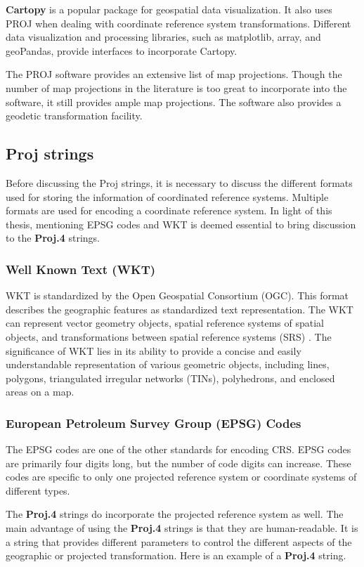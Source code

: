 \textbf{Cartopy} is a popular package for geospatial data visualization. It also uses PROJ when dealing with coordinate reference system transformations. Different data visualization and processing libraries, such as matplotlib, array, and geoPandas, provide interfaces to incorporate Cartopy.

The PROJ software provides an extensive list of map projections. Though the number of map projections in the literature is too great to incorporate into the software, it still provides ample map projections. The software also provides a geodetic transformation facility.

\subsection{Proj strings}
Before discussing the Proj strings, it is necessary to discuss the different formats used for storing the information of coordinated reference systems. Multiple formats are used for encoding a coordinate reference system. In light of this thesis, mentioning EPSG codes and WKT is deemed essential to bring discussion to the \textbf{Proj.4} strings.

\subsubsection{Well Known Text (WKT)}
WKT is standardized by the Open Geospatial Consortium (OGC)\cite{locWellknownText}. This format describes the geographic features as standardized text representation.
The WKT can represent vector geometry objects, spatial reference systems of spatial objects, and transformations between spatial reference systems (SRS) \cite{locWellknownText}.
The significance of WKT lies in its ability to provide a concise and easily understandable representation of various geometric objects, including lines, polygons, triangulated irregular networks (TINs), polyhedrons, and enclosed areas on a map\cite{locWellknownText}.

\subsubsection{European Petroleum Survey Group (EPSG) Codes}
The EPSG codes are one of the other standards for encoding CRS. EPSG codes are primarily four digits long, but the number of code digits can increase. These codes are specific to only one projected reference system or coordinate systems of different types.

The \textbf{Proj.4} strings do incorporate the projected reference system as well. The main advantage of using the \textbf{Proj.4} strings is that they are human-readable. It is a string that provides different parameters to control the different aspects of the geographic or projected transformation.
Here is an example of a \textbf{Proj.4} string.

